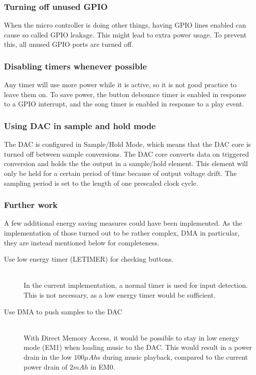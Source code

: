 \subsubsection{Turning off unused GPIO}
When the micro controller is doing other things, having GPIO lines enabled can cause so called GPIO leakage.
This might lead to extra power usage.
To prevent this, all unused GPIO ports are turned off.

\subsubsection{Disabling timers whenever possible}
Any timer will use more power while it is active, so it is not good practice to leave them on.
To save power, the button debounce timer is enabled in response to a GPIO interrupt, and the song timer is enabled in response to a play event. 

\subsubsection{Using DAC in sample and hold mode}
The DAC is configured in Sample/Hold Mode, which means that the DAC core is turned off between sample conversions.
The DAC core converts data on triggered conversion and holds the the output in a sample/hold element.
This element will only be held for a certain period of time because of output voltage drift.
The sampling period is set to the length of one prescaled clock cycle.

\subsubsection{Further work}
A few additional energy saving measures could have been implemented.
As the implementation of those turned out to be rather complex, DMA in particular, they are instead mentioned below for completeness.

\begin{description}
  \item[Use low energy timer (LETIMER) for checking buttons.] \hfill \\
        In the current implementation, a normal timer is used for input detection. This is not necessary, as a low energy timer would be sufficient. 
  \item[Use DMA to push samples to the DAC] \hfill \\ \label{DMA} 
      With Direct Memory Access, it would be possible to stay in low energy mode (EM1) when loading music to the DAC. This would result in a power drain in the low $ 100 \mu Ah $s during music playback, compared to the current power drain of $ 2 mAh $ in EM0.
\end{description}



